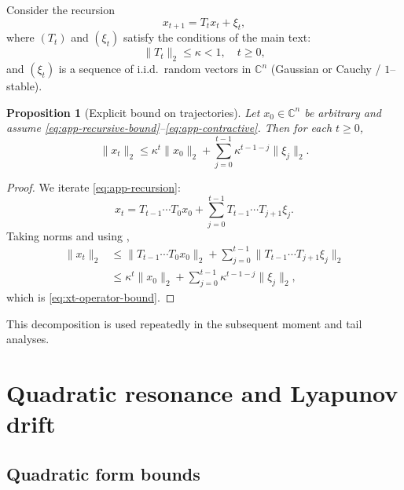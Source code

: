 \documentclass[11pt]{article}
\theoremstyle{plain}
\newtheorem{proposition}[theorem]{Proposition}
\theoremstyle{definition}
\numberwithin{equation}{section}
\begin{document}
Consider the recursion
\begin{equation}
  x_{t+1} = T_t x_t + \xi_t,
  \label{eq:app-recursion}
\end{equation}
where $(T_t)$ and $(\xi_t)$ satisfy the conditions of the main text:
\begin{equation}
  \|T_t\|_2 \le \kappa < 1,
  \quad t \ge 0,
  \label{eq:app-contractive}
\end{equation}
and $(\xi_t)$ is a sequence of i.i.d.\ random vectors in
$\mathbb{C}^n$ (Gaussian or Cauchy / $1$--stable).

\begin{proposition}[Explicit bound on trajectories]
\label{prop:trajectory-bound}
Let $x_0 \in \mathbb{C}^n$ be arbitrary and assume
\eqref{eq:app-recursive-bound}--\eqref{eq:app-contractive}. Then for
each $t \ge 0$,
\begin{equation}
  \|x_t\|_2
  \le
  \kappa^t \|x_0\|_2 + 
  \sum_{j=0}^{t-1} \kappa^{t-1-j} \|\xi_j\|_2.
  \label{eq:xt-operator-bound}
\end{equation}
\end{proposition}

\begin{proof}
We iterate \eqref{eq:app-recursion}:
\begin{equation*}
  x_t
  = T_{t-1} \cdots T_0 x_0 + 
    \sum_{j=0}^{t-1} T_{t-1} \cdots T_{j+1} \xi_j.
\end{equation*}
Taking norms and using ,
\begin{align*}
  \|x_t\|_2
  &\le \|T_{t-1} \cdots T_0 x_0\|_2
    + \sum_{j=0}^{t-1} \|T_{t-1}\cdots T_{j+1}\xi_j\|_2 \\
  &\le \kappa^t \|x_0\|_2
    + \sum_{j=0}^{t-1} \kappa^{t-1-j} \|\xi_j\|_2,
\end{align*}
which is \eqref{eq:xt-operator-bound}.
\end{proof}

This decomposition is used repeatedly in the subsequent moment and
tail analyses.

\section{Quadratic resonance and Lyapunov drift}

\subsection{Quadratic form bounds}
\end{document}
